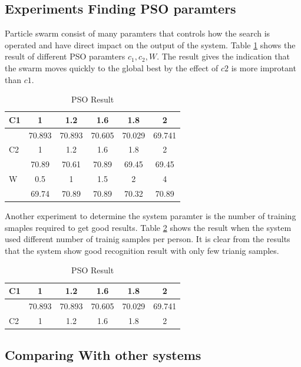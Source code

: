 \documentclass[a4paper,twoside]{article}
\begin{document}
\subsection{Experiments Finding PSO paramters}
\label{sec:pso}

Particle swarm consist of many paramters that controls how the search is operated and have direct impact on the output of the system. Table \ref{tab:PSO1} shows the result of different PSO paramters $c_1,c_2,W$. The result gives the indication that the swarm moves quickly to the global best by the effect of $c2$ is more improtant than $c1$. 

\begin{table}
	\centering
		\caption{PSO Result }
	\label{tab:PSO1}
		\begin{tabular}{|l|c|c|c|c|c|}
		 \hline
C1 &	1	&1.2&	1.6&	1.8 &	2	\\ \hline
	&70.893	&70.893	&70.605	&70.029	&69.741 \\  \hline
C2	&	1	&1.2&	1.6&	1.8 &	2	\\ \hline
	&70.89	&70.61	&70.89	&69.45	&69.45 \\ \hline
W	&0.5&	1	&1.5	&2&	4	\\ \hline
	&69.74	&70.89&	70.89	&70.32&	70.89	\\ \hline
\end{tabular}
\end{table}

Another experiment to determine the system paramter is the number of training smaples required to get good results. Table \ref{tab:PSOtrainTest} shows the result when the system used different number of trainig samples per person. It is clear from the results that the system show good recognition result with only few trianig samples. 

\begin{table}
	\centering
		\caption{PSO Result }
	\label{tab:PSOtrainTest}
		\begin{tabular}{|l|c|c|c|c|c|}
		 \hline
C1 &	1	&1.2&	1.6&	1.8 &	2	\\ \hline
	&70.893	&70.893	&70.605	&70.029	&69.741 \\  \hline
C2	&	1	&1.2&	1.6&	1.8 &	2	\\ \hline
 
\end{tabular}
\end{table}

\subsection {Comparing With other systems}
\label{sec:comparingSystems}
\end{document}
